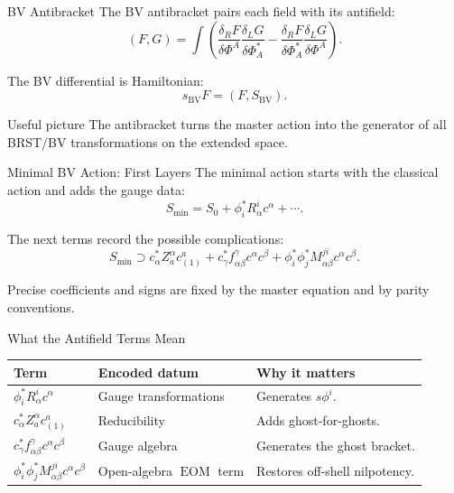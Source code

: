 \documentclass[aspectratio=169,professionalfonts]{beamer}
\newcommand{\slidecite}[1]{{\scriptsize\color{CourseGold}#1}}
\newcommand{\EOM}{\ensuremath{\operatorname{EOM}}}
\newcommand{\BV}{\ensuremath{S_{\mathrm{BV}}}}
\begin{document}
\begin{frame}{BV Antibracket}
  The BV antibracket pairs each field with its antifield:
  \[
    (F,G)
    =\int
    \left(
    \frac{\delta_R F}{\delta\Phi^A}
    \frac{\delta_L G}{\delta\Phi_A^*}
    -
    \frac{\delta_R F}{\delta\Phi_A^*}
    \frac{\delta_L G}{\delta\Phi^A}
    \right).
  \]

  The BV differential is Hamiltonian:
  \[
    s_{\mathrm{BV}}F=(F,\BV).
  \]

  \begin{block}{Useful picture}
    The antibracket turns the master action into the generator of all BRST/BV
    transformations on the extended space.
  \end{block}
\end{frame}

\begin{frame}{Minimal BV Action: First Layers}
  The minimal action starts with the classical action and adds the gauge data:
  \[
    S_{\min}
    =S_0+\phi_i^*R^i_\alpha c^\alpha+\cdots .
  \]

  The next terms record the possible complications:
  \[
    S_{\min}\supset
    c_\alpha^*Z^\alpha_a c^a_{(1)}
    +c_\gamma^*f^\gamma_{\alpha\beta}c^\alpha c^\beta
    +\phi_i^*\phi_j^*M^{ji}_{\alpha\beta}c^\alpha c^\beta .
  \]

  \slidecite{Precise coefficients and signs are fixed by the master equation and by parity conventions.}
\end{frame}

\begin{frame}{What the Antifield Terms Mean}
  \small
  \begin{tabular}{>{\raggedright\arraybackslash}p{}
                  >{\raggedright\arraybackslash}p{}
                  >{\raggedright\arraybackslash}p{}}
    \toprule
    Term & Encoded datum & Why it matters \\
    \midrule
    $\phi_i^*R^i_\alpha c^\alpha$ &
    Gauge transformations &
    Generates $s\phi^i$. \\
    $c_\alpha^*Z^\alpha_a c^a_{(1)}$ &
    Reducibility &
    Adds ghost-for-ghosts. \\
    $c_\gamma^*f^\gamma_{\alpha\beta}c^\alpha c^\beta$ &
    Gauge algebra &
    Generates the ghost bracket. \\
    $\phi_i^*\phi_j^*M^{ji}_{\alpha\beta}c^\alpha c^\beta$ &
    Open-algebra \EOM{} term &
    Restores off-shell nilpotency. \\
    \bottomrule
  \end{tabular}
\end{frame}
\end{document}
